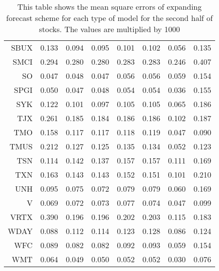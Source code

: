\begin{table}[ht]
\begin{tabular}{rrrrrrrr}
  SBUX & 0.133 & 0.094 & 0.095 & 0.101 & 0.102 & 0.056 & 0.135 \\ 
  SMCI & 0.294 & 0.280 & 0.280 & 0.283 & 0.283 & 0.246 & 0.407 \\ 
  SO & 0.047 & 0.048 & 0.047 & 0.056 & 0.056 & 0.059 & 0.154 \\ 
  SPGI & 0.050 & 0.047 & 0.048 & 0.054 & 0.054 & 0.036 & 0.155 \\ 
  SYK & 0.122 & 0.101 & 0.097 & 0.105 & 0.105 & 0.065 & 0.186 \\ 
  TJX & 0.261 & 0.185 & 0.184 & 0.186 & 0.186 & 0.102 & 0.187 \\ 
  TMO & 0.158 & 0.117 & 0.117 & 0.118 & 0.119 & 0.047 & 0.090 \\ 
  TMUS & 0.212 & 0.127 & 0.125 & 0.135 & 0.134 & 0.052 & 0.123 \\ 
  TSN & 0.114 & 0.142 & 0.137 & 0.157 & 0.157 & 0.111 & 0.169 \\ 
  TXN & 0.163 & 0.143 & 0.143 & 0.152 & 0.151 & 0.101 & 0.210 \\ 
  UNH & 0.095 & 0.075 & 0.072 & 0.079 & 0.079 & 0.060 & 0.169 \\ 
  V & 0.069 & 0.072 & 0.073 & 0.077 & 0.074 & 0.047 & 0.099 \\ 
  VRTX & 0.390 & 0.196 & 0.196 & 0.202 & 0.203 & 0.115 & 0.183 \\ 
  WDAY & 0.088 & 0.112 & 0.114 & 0.123 & 0.128 & 0.086 & 0.124 \\ 
  WFC & 0.089 & 0.082 & 0.082 & 0.092 & 0.093 & 0.059 & 0.154 \\ 
  WMT & 0.064 & 0.049 & 0.050 & 0.052 & 0.052 & 0.030 & 0.076 \\ 
   \hline
\end{tabular}
\caption[MSE expanding forecast (2)]{This table shows the mean square errors of expanding forecast scheme for each type of model for the second half of stocks. 
                     The values are multiplied by 1000} 
\label{Table:MSE_e_2}
\end{table}
